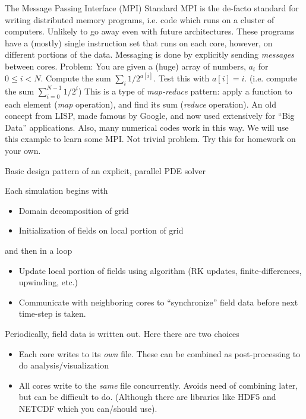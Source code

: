 \documentclass[aspectratio=169]{beamer}
\newcommand{\mypause}{\pause}
\begin{document}
\begin{frame}{The Message Passing Interface (MPI) Standard}
  \footnotesize%
  MPI is the de-facto standard for writing {\color{blue} distributed
    memory} programs, i.e. code which runs on a cluster of
  computers. Unlikely to go away even with future architectures.%
  \vskip0.1in%
  These programs have a (mostly) single instruction set that runs on
  each core, however, on different portions of the data. Messaging is
  done by explicitly sending \emph{messages} between cores.%
  \vskip0.1in%
  \mypause%
  {\color{blue} Problem: You are given a (huge) array of numbers,
    $a_i$ for $0\le i < N$. Compute the sum $\sum_i 1/2^{a[i]}$.  Test
    this with $a[i] = i$. (i.e. compute the sum
    $\sum_{i=0}^{N-1} 1/2^i$)} \mypause%
  \vskip0.1in%
  This is a type of \emph{map-reduce} pattern: apply a function to
  each element (\emph{map} operation), and find its sum (\emph{reduce}
  operation). An old concept from LISP, made famous by Google, and now
  used extensively for ``Big Data'' applications. Also, many numerical
  codes work in this way.%
  \vskip0.1in%
  We will use this example to learn some MPI. {\color{blue} Not
    trivial problem. Try this for homework on your own.}
\end{frame}

\begin{frame}{Basic design pattern of an explicit, parallel PDE
    solver}

  Each simulation begins with
  \begin{itemize}
  \item Domain decomposition of grid
  \item Initialization of fields on local portion of grid
  \end{itemize}
  \mypause%
  and then in a loop
  \begin{itemize}
  \item Update local portion of fields using algorithm (RK updates,
    finite-differences, upwinding, etc.)
  \item Communicate with neighboring cores to ``synchronize'' field data
    before next time-step is taken.
  \end{itemize}
  \mypause%
  Periodically, field data is written out. Here there are two choices
  \begin{itemize}
  \item Each core writes to its \emph{own} file. These can be combined
    as post-processing to do analysis/visualization
  \item All cores write to the \emph{same} file concurrently. Avoids
    need of combining later, but can be difficult to do. (Although
    there are libraries like HDF5 and NETCDF which you can/should
    use).
  \end{itemize}

\end{frame}
\end{document}
